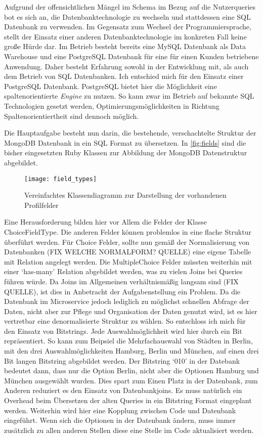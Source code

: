 Aufgrund der offensichtlichen Mängel im Schema im Bezug auf die Nutzerqueries bot es sich an, die Datenbanktechnologie zu wechseln und stattdessen eine SQL Datenbank zu verwenden. Im Gegensatz zum Wechsel der Programmiersprache, stellt der Einsatz einer anderen Datenbanktechnologie im konkreten Fall keine große Hürde dar. Im Betrieb besteht bereits eine MySQL\cite{mysql} Datenbank als Data Warehouse und eine PostgreSQL\cite{postgres} Datenbank für eine für einen Kunden betriebene Anwendung. Daher besteht Erfahrung sowohl in der Entwicklung mit, als auch dem Betrieb von SQL Datenbanken.
Ich entschied mich für den Einsatz einer PostgreSQL Datenbank. PostgreSQL bietet hier die Möglichkeit eine spaltenorientierte \textit{Engine} zu nutzen\cite{postgres:column}. So kann zwar im Betrieb auf bekannte SQL Technologien gesetzt werden, Optimierungsmöglichkeiten in Richtung Spaltenorientiertheit sind dennoch möglich.

Die Hauptaufgabe besteht nun darin, die bestehende, verschachtelte Struktur der MongoDB Datenbank in ein SQL Format zu übersetzen.
In \autoref{fig:fields} sind die bisher eingesetzten Ruby Klassen zur Abbildung der MongoDB Datenstruktur abgebildet. 

\begin{figure}[!ht]
    \centering
    \caption{Vereinfachtes Klassendiagramm zur Darstellung der vorhandenen Profilfelder}
    \label{fig:fields}
    \texttt{[image: field\_types]}
\end{figure}

Eine Herausforderung bilden hier vor Allem die Felder der Klasse ChoiceFieldType. Die anderen Felder können problemlos in eine flache Struktur überführt werden. Für Choice Felder, sollte nun gemäß der Normalisierung von Datenbanken (FIX WELCHE NORMALFORM? QUELLE) eine eigene Tabelle mit Relation angelegt werden. Die MultipleChoice Felder müssten weiterhin mit einer `has-many' Relation abgebildet werden, was zu vielen Joins bei Queries führen würde. Da Joins im Allgemeinen verhältnismäßig langsam sind (FIX QUELLE), ist dies in Anbetracht der Aufgabenstellung ein Problem. Da die Datenbank im Microservice jedoch lediglich zu möglichst schnellen Abfrage der Daten, nicht aber zur Pflege und Organisation der Daten genutzt wird, ist es hier vertretbar eine denormalisierte Struktur zu wählen. So entschloss ich mich für den Einsatz von Bitstrings. Jede Auswahlmöglichkeit wird hier durch ein Bit repräsentiert. So kann zum Beipsiel die Mehrfachauswahl von Städten in Berlin, mit den drei Auswahlmöglichkeiten Hamburg, Berlin und München, auf einen drei Bit langen Bitstring abgebildet werden. Der Bitstring `010' in der Datebank bedeutet dann, dass nur die Option Berlin, nicht aber die Optionen Hamburg und München ausgewählt wurden. Dies spart zum Einen Platz in der Datenbank, zum Anderen reduziert es den Einsatz von Datenbankjoins. Es muss natürlich ein Overhead beim Übersetzen der alten Queries in ein Bitstring Format eingeplant werden. Weiterhin wird hier eine Kopplung zwischen Code und Datenbank eingeführt. Wenn sich die Optionen in der Datenbank ändern, muss immer zusätzlich zu allen anderen Stellen diese eine Stelle im Code aktualisiert werden.

